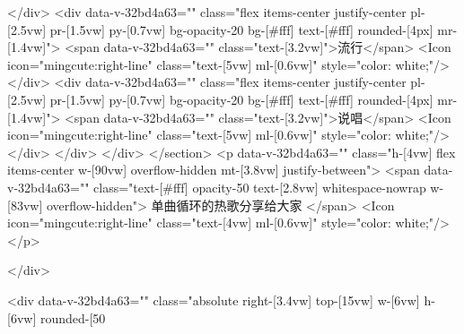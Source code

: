                             </div>
                            <div data-v-32bd4a63="" class="flex items-center justify-center pl-[2.5vw] pr-[1.5vw] py-[0.7vw] bg-opacity-20 bg-[#fff] text-[#fff] rounded-[4px] mr-[1.4vw]">
                                <span data-v-32bd4a63="" class="text-[3.2vw]">流行</span> 
                                <Icon icon="mingcute:right-line" class="text-[5vw] ml-[0.6vw]" style="color: white;"/>
                            </div>
                            <div data-v-32bd4a63="" class="flex items-center justify-center pl-[2.5vw] pr-[1.5vw] py-[0.7vw] bg-opacity-20 bg-[#fff] text-[#fff] rounded-[4px] mr-[1.4vw]">
                                <span data-v-32bd4a63="" class="text-[3.2vw]">说唱</span> 
                                <Icon icon="mingcute:right-line" class="text-[5vw] ml-[0.6vw]" style="color: white;"/>
                            </div>
                        </div>
                    </div>
                </section> 
                <p data-v-32bd4a63="" class="h-[4vw] flex items-center w-[90vw] overflow-hidden mt-[3.8vw] justify-between">
                    <span data-v-32bd4a63="" class="text-[#fff] opacity-50 text-[2.8vw] whitespace-nowrap w-[83vw] overflow-hidden">
                        单曲循环的热歌分享给大家
                    </span> 
                    <Icon icon="mingcute:right-line" class="text-[4vw] ml-[0.6vw]" style="color: white;"/>
                </p>
              
            </div>
            
            <div data-v-32bd4a63="" class="absolute right-[3.4vw] top-[15vw] w-[6vw] h-[6vw] rounded-[50%

